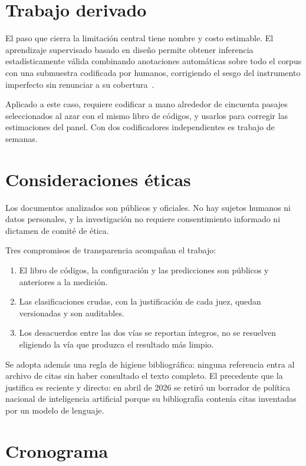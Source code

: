 \documentclass[12pt,letterpaper]{article}
\begin{document}
\section{Trabajo derivado}

El paso que cierra la limitación central tiene nombre y costo estimable. El aprendizaje supervisado basado en diseño permite obtener inferencia estadísticamente válida combinando anotaciones automáticas sobre todo el corpus con una submuestra codificada por humanos, corrigiendo el sesgo del instrumento imperfecto sin renunciar a su cobertura~\citep{egami2023dsl}.

Aplicado a este caso, requiere codificar a mano alrededor de cincuenta pasajes seleccionados al azar con el mismo libro de códigos, y usarlos para corregir las estimaciones del panel. Con dos codificadores independientes es trabajo de semanas.


\section{Consideraciones éticas}

Los documentos analizados son públicos y oficiales. No hay sujetos humanos ni datos personales, y la investigación no requiere consentimiento informado ni dictamen de comité de ética.

Tres compromisos de transparencia acompañan el trabajo:

\begin{enumerate}[leftmargin=*]
  \item El libro de códigos, la configuración y las predicciones son públicos y anteriores a la medición.
  \item Las clasificaciones crudas, con la justificación de cada juez, quedan versionadas y son auditables.
  \item Los desacuerdos entre las dos vías se reportan íntegros, no se resuelven eligiendo la vía que produzca el resultado más limpio.
\end{enumerate}

Se adopta además una regla de higiene bibliográfica: ninguna referencia entra al archivo de citas sin haber consultado el texto completo. El precedente que la justifica es reciente y directo: en abril de 2026 se retiró un borrador de política nacional de inteligencia artificial porque su bibliografía contenía citas inventadas por un modelo de lenguaje.


\section{Cronograma}
\end{document}
